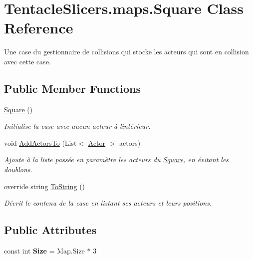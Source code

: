 \hypertarget{class_tentacle_slicers_1_1maps_1_1_square}{}\section{Tentacle\+Slicers.\+maps.\+Square Class Reference}
\label{class_tentacle_slicers_1_1maps_1_1_square}


Une case du gestionnaire de collisions qui stocke les acteurs qui sont en collision avec cette case.  


\subsection*{Public Member Functions}
\begin{DoxyCompactItemize}
\item 
\hyperlink{class_tentacle_slicers_1_1maps_1_1_square_a9e71545a8dcf75175a3053725e1c3364}{Square} ()
\begin{DoxyCompactList}\small\item\em Initialise la case avec aucun acteur à l\textquotesingle{}intérieur. \end{DoxyCompactList}\item 
void \hyperlink{class_tentacle_slicers_1_1maps_1_1_square_ad34913b602e2716f011f1b9810eb02ca}{Add\+Actors\+To} (List$<$ \hyperlink{class_tentacle_slicers_1_1actors_1_1_actor}{Actor} $>$ actors)
\begin{DoxyCompactList}\small\item\em Ajoute à la liste passée en paramètre les acteurs du \hyperlink{class_tentacle_slicers_1_1maps_1_1_square}{Square}, en évitant les doublons. \end{DoxyCompactList}\item 
override string \hyperlink{class_tentacle_slicers_1_1maps_1_1_square_af8509f3f78a9c48d7037ba3fddecc741}{To\+String} ()
\begin{DoxyCompactList}\small\item\em Décrit le contenu de la case en listant ses acteurs et leurs positions. \end{DoxyCompactList}\end{DoxyCompactItemize}
\subsection*{Public Attributes}
\begin{DoxyCompactItemize}
\item 
\mbox{\label{class_tentacle_slicers_1_1maps_1_1_square_a1d372fec71fc289eb9bd2add34ae005e}} 
const int {\bfseries Size} = Map.\+Size $\ast$ 3
\end{DoxyCompactItemize}

